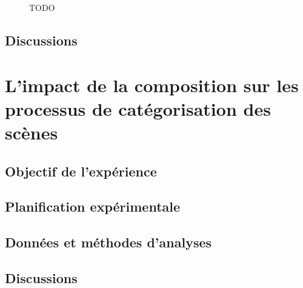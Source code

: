 \begin{figure}[t]
        \caption[TODO]{TODO}\label{fig:soundlevelSansMarker}
\end{figure}

\subsection{Discussions}


\section{L'impact de la composition sur les processus de catégorisation des scènes}
\label{sec:xp4}

\subsection{Objectif de l'expérience}

\subsection{Planification expérimentale}

\subsection{Données et méthodes d'analyses}

\subsection{Discussions}




